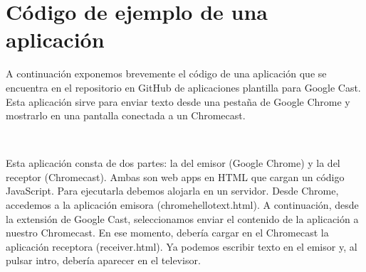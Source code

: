 \section{Código de ejemplo de una aplicación}

A continuación exponemos brevemente el código de una aplicación que se encuentra en el repositorio en GitHub de aplicaciones plantilla para Google Cast. Esta aplicación sirve para enviar texto desde una pestaña de Google Chrome y mostrarlo en una pantalla conectada a un Chromecast.

\

Esta aplicación consta de dos partes: la del emisor (Google Chrome) y la del receptor (Chromecast).
Ambas son web apps en HTML que cargan un código JavaScript.
Para ejecutarla debemos alojarla en un servidor.
Desde Chrome, accedemos a la aplicación emisora (chromehellotext.html).
A continuación, desde la extensión de Google Cast, seleccionamos enviar el contenido de la aplicación a nuestro Chromecast.
En ese momento, debería cargar en el Chromecast la aplicación receptora (receiver.html).
Ya podemos escribir texto en el emisor y, al pulsar intro, debería aparecer en el televisor.

